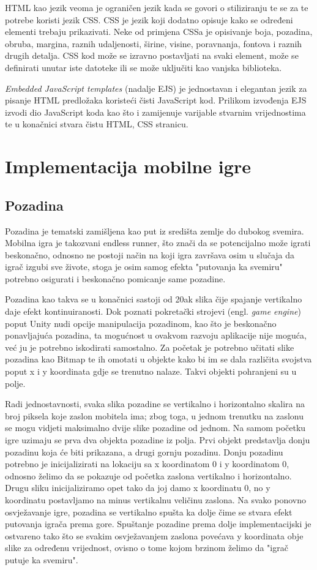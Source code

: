 \documentclass[times, utf8, zavrsni]{fer}
\begin{document}
	HTML kao jezik veoma je ograničen jezik kada se govori o stiliziranju te se za te potrebe koristi jezik CSS. CSS je jezik koji dodatno opisuje kako se određeni elementi trebaju prikazivati. Neke od primjena CSSa je opisivanje boja, pozadina, obruba,
	margina, raznih udaljenosti, širine, visine, poravnanja, fontova i raznih drugih detalja. CSS kod može se izravno postavljati na svaki element, može se definirati unutar iste datoteke ili se može uključiti kao vanjska biblioteka. 
	
	\textit{Embedded JavaScript templates} (nadalje EJS) je jednostavan i elegantan jezik za pisanje HTML predložaka koristeći čisti JavaScript kod. Prilikom izvođenja EJS izvodi dio JavaScript koda kao što i zamijenuje varijable stvarnim vrijednostima te
	u konačnici stvara čistu HTML, CSS stranicu.
	

\chapter{Implementacija mobilne igre}

	\section{Pozadina}
	Pozadina je tematski zamišljena kao put iz središta zemlje  do dubokog svemira. Mobilna igra je takozvani endless runner, što znači da se potencijalno može igrati beskonačno,
	odnosno ne postoji način na koji igra završava osim u slučaja da igrač izgubi sve živote, stoga je osim samog efekta "putovanja ka svemiru" potrebno osigurati i beskonačno pomicanje same pozadine.
	
	Pozadina kao takva se u konačnici sastoji od 20ak slika čije spajanje vertikalno daje efekt kontinuiranosti. Dok poznati pokretački strojevi (engl. \textit{game engine}) poput Unity nudi opcije manipulacija
	pozadinom, kao što je beskonačno ponavljajuća pozadina, ta mogućnost u ovakvom razvoju aplikacije nije moguća, već ju je potrebno iskodirati samostalno. 
	Za početak je potrebno učitati slike pozadina kao Bitmap te ih omotati u objekte kako bi im se dala različita svojstva poput x i y koordinata gdje se trenutno nalaze. Takvi objekti pohranjeni su u polje.
	
	Radi jednostavnosti, svaka slika pozadine se  vertikalno i horizontalno skalira na broj piksela koje zaslon mobitela ima; zbog toga, u jednom trenutku na zaslonu se mogu vidjeti maksimalno dvije slike
	pozadine od jednom. Na samom početku igre uzimaju se prva dva objekta pozadine iz polja. Prvi objekt predstavlja donju pozadinu koja će biti prikazana, a drugi gornju pozadinu.  Donju pozadinu potrebno je inicijalizirati
	na lokaciju sa x koordinatom 0 i y koordinatom 0, odnosno želimo da se pokazuje od početka zaslona vertikalno i horizontalno. Drugu sliku inicijaliziramo opet tako da joj damo x koordinatu 0, no y koordinatu postavljamo
	na minus vertikalnu veličinu zaslona. Na svako ponovno osvježavanje igre, pozadina se vertikalno spušta ka dolje čime se stvara efekt putovanja igrača prema gore. Spuštanje pozadine prema dolje implementacijski je 
	ostvareno tako što se svakim osvježavanjem zaslona povećava y koordinata obje slike za određenu vrijednost, ovisno o tome kojom brzinom želimo da "igrač putuje ka svemiru". 
	
\end{document}
